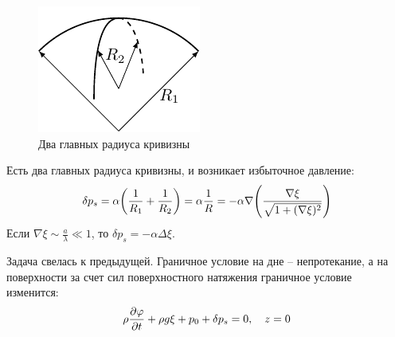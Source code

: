 \begin{figure}[H]
    \centering
    \includegraphics[scale=1.5]{img/2rad}
    \caption{Два главных радиуса кривизны}
    \label{fig:2rad}
\end{figure}

Есть два главных радиуса кривизны, и возникает избыточное давление:
\begin{equation}
    \delta p_s = \alpha\qty(\frac{1}{R_1}+\frac{1}{R_2}) = \alpha \frac{1}{R} = -\alpha\nabla \qty(\frac{\nabla\xi}{\sqrt{1+(\nabla\xi)^2}})
\end{equation}
Если $\nabla\xi \sim \frac{a}{\lambda} \ll 1$, то $\delta p_s = -\alpha \Delta \xi$.

Задача свелась к предыдущей. Граничное условие на дне -- непротекание, а на поверхности за счет сил поверхностного натяжения граничное условие изменится:
\begin{equation}
    \rho\pdv{\varphi}{t}+\rho g\xi+p_0+\delta p_s = 0, \quad z = 0
\end{equation}

